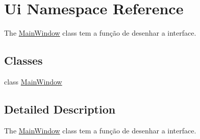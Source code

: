 \hypertarget{namespace_ui}{}\section{Ui Namespace Reference}
\label{namespace_ui}


The \mbox{\hyperlink{class_ui_1_1_main_window}{Main\+Window}} class tem a função de desenhar a interface.  


\subsection*{Classes}
\begin{DoxyCompactItemize}
\item 
class \mbox{\hyperlink{class_ui_1_1_main_window}{Main\+Window}}
\end{DoxyCompactItemize}


\subsection{Detailed Description}
The \mbox{\hyperlink{class_ui_1_1_main_window}{Main\+Window}} class tem a função de desenhar a interface. 